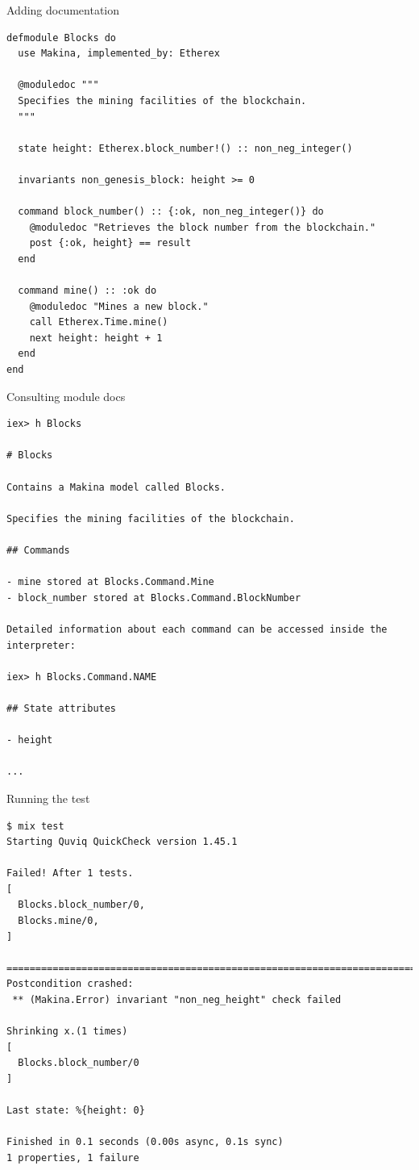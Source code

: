 \documentclass[aspectratio=169, 10pt]{beamer}
\begin{document}
\begin{frame}[label={sec:orgf76bff1},fragile]{Adding documentation}
 \lstset{language=elixir,label= ,caption= ,captionpos=b,numbers=none,style=display}
\begin{lstlisting}
defmodule Blocks do
  use Makina, implemented_by: Etherex

  @moduledoc """
  Specifies the mining facilities of the blockchain.
  """

  state height: Etherex.block_number!() :: non_neg_integer()

  invariants non_genesis_block: height >= 0

  command block_number() :: {:ok, non_neg_integer()} do
    @moduledoc "Retrieves the block number from the blockchain."
    post {:ok, height} == result
  end

  command mine() :: :ok do
    @moduledoc "Mines a new block."
    call Etherex.Time.mine()
    next height: height + 1
  end
end
\end{lstlisting}
\end{frame}


\begin{frame}[label={sec:org8b35479},fragile]{Consulting module docs}
 \lstset{language=shell,label= ,caption= ,captionpos=b,numbers=none,style=display}
\begin{lstlisting}
iex> h Blocks

# Blocks

Contains a Makina model called Blocks.

Specifies the mining facilities of the blockchain.

## Commands

- mine stored at Blocks.Command.Mine
- block_number stored at Blocks.Command.BlockNumber

Detailed information about each command can be accessed inside the interpreter:

iex> h Blocks.Command.NAME

## State attributes

- height

...
\end{lstlisting}
\end{frame}


\begin{frame}[label={sec:org5431f3b},fragile]{Running the test}
 \lstset{language=shell,label= ,caption= ,captionpos=b,numbers=none,style=display}
\begin{lstlisting}
$ mix test
Starting Quviq QuickCheck version 1.45.1

Failed! After 1 tests.
[
  Blocks.block_number/0,
  Blocks.mine/0,
]

================================================================================
Postcondition crashed:
 ** (Makina.Error) invariant "non_neg_height" check failed

Shrinking x.(1 times)
[
  Blocks.block_number/0
]

Last state: %{height: 0}

Finished in 0.1 seconds (0.00s async, 0.1s sync)
1 properties, 1 failure
\end{lstlisting}
\end{frame}
\end{document}
